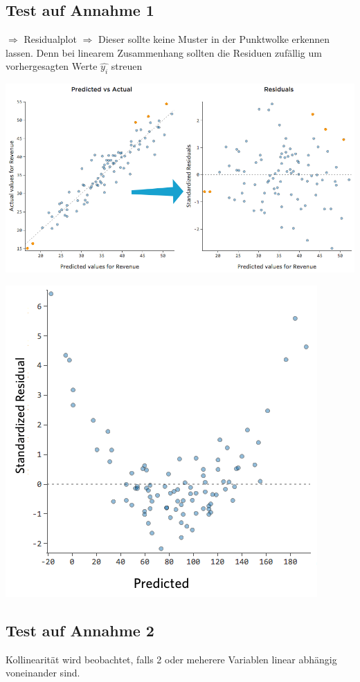 \subsection{Test auf Annahme 1}
$\Rightarrow$ Residualplot
$\Rightarrow$ Dieser sollte keine Muster in der Punktwolke erkennen lassen. Denn bei linearem Zusammenhang sollten die Residuen zufällig um vorhergesagten Werte $\hat{y_i}$ streuen

\includegraphics[scale=0.4]{VorlesungenTexDateien/images/residual}
       
\includegraphics[scale=0.5]{VorlesungenTexDateien/images/Nonlinear-residual-11}

\subsection{Test auf Annahme 2}
Kollinearität wird beobachtet, falls 2 oder meherere Variablen linear abhängig voneinander sind.

